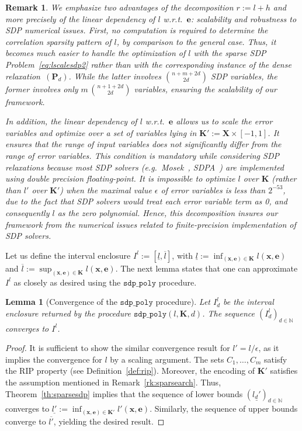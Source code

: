 \documentclass[preprint,fleqn,nocopyrightspace]{sigplanconf}
\newcommand{\N}{\mathbb{N}}
\newcommand{\x}{\mathbf{x}}
\newcommand{\e}{\mathbf{e}}
\def\P{\mathbf{P}}
\def\K{\mathbf{K}}
\def\X{\mathbf{X}}
\newcommand{\sdppolyfun}[3]{\mathtt{sdp\_poly}(#1, #2, #3)}
\newcommand{\sdppoly}{\mathtt{sdp\_poly}}
\newtheorem{lemma}[theorem]{Lemma}
\theoremstyle{plain}
\newtheorem{remark}{Remark}
\begin{document}
%
\begin{remark}
We emphasize two advantages of the decomposition $r := l + h$ and more precisely of the linear dependency of $l$ w.r.t.~$\e$: scalability and robustness to SDP numerical issues.
First, no computation is required to determine the correlation sparsity pattern of $l$, by comparison to the general case. Thus, it becomes much easier to handle the optimization of $l$ with the sparse SDP Problem~\eqref{eq:lscalesdp2} rather than with the corresponding instance of the dense relaxation~$(\P_d)$. While the latter involves $\binom{n + m+ 2 d}{2 d}$ SDP variables, the former involves only $m \, \binom{n + 1 + 2 d}{2 d}$ variables, ensuring the scalability of our framework.

In addition, the linear dependency of $l$ w.r.t.~$\e$ allows us to scale the error variables and optimize over a set of variables lying in $\K' := \X \times [-1, 1]$. It ensures that the range of input variables does not significantly differ from the range of error variables. This condition is mandatory while considering SDP relaxations because most SDP solvers (e.g.~{\sc Mosek}~\cite{mosek}, {\sc SDPA}~\cite{sdpa7}) are implemented using double precision floating-point. It is impossible to optimize $l$ over $\K$ (rather than $l'$ over $\K'$) when the maximal value $\epsilon$ of error variables is less than $2^{-53}$, due to the fact that SDP solvers would treat each error variable term as 0, and consequently $l$ as the zero polynomial. Hence, this decomposition insures our framework from the numerical issues related to finite-precision implementation of SDP solvers.
\end{remark}
%
Let us define the interval enclosure $I^l := [\underline{l}, \overline{l}]$, with $\underline{l} := \inf_{(\x,\e) \in \K} l(\x,\e)$ and $\overline{l} := \sup_{(\x,\e) \in \K} l(\x,\e)$.
The next lemma states that one can approximate $I^l$ as closely as desired using the $\sdppoly$ procedure.
\begin{lemma}[Convergence of the $\sdppoly$ procedure]
\label{th:cvg_sdppoly}
Let $I_d^l$ be the interval enclosure returned by the procedure $\sdppolyfun{l}{\K}{d}$. The sequence $(I_d^l)_{d \in \N}$ converges to $I^l$.
\end{lemma}
%
\vspace*{-0.2cm}
\begin{proof}
It is sufficient to show the similar convergence result for $l' = l/\epsilon$, as it implies the convergence for $l$ by a scaling argument.
The sets $C_1,\dots, C_m$ satisfy the RIP property (see Definition~\ref{def:rip}). Moreover, the encoding of $\K'$ satisfies the assumption mentioned in Remark~\ref{rk:sparsearch}. Thus, Theorem~\ref{th:sparsesdp} implies that the sequence of lower bounds $(\underline{l_d'})_{d \in \N}$ converges to $\underline{l'} := \inf_{(\x,\e) \in \K'} l'(\x,\e)$. Similarly, the sequence of upper bounds converge to $\overline{l'}$, yielding the desired result.
\end{proof}
\end{document}
